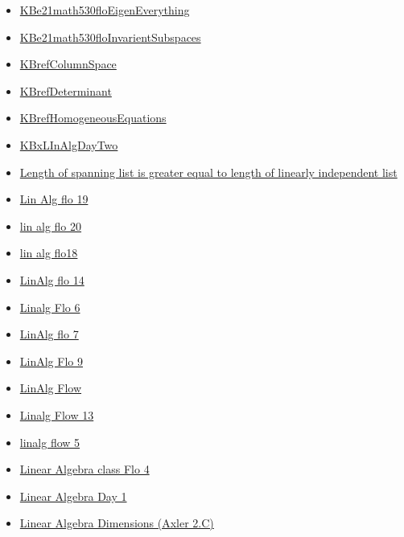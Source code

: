 \documentclass[11pt]{article}
\begin{document}
\begin{itemize}
\begin{itemize}
\begin{itemize}
\item \href{mathematics/linear\_algebra/KBe21math530floEigenEverything.org}{KBe21math530floEigenEverything}
\item \href{mathematics/linear\_algebra/KBe21math530floInvarientSubspaces.org}{KBe21math530floInvarientSubspaces}
\item \href{mathematics/linear\_algebra/KBrefColumnSpace.org}{KBrefColumnSpace}
\item \href{mathematics/linear\_algebra/KBrefDeterminant.org}{KBrefDeterminant}
\item \href{mathematics/linear\_algebra/KBrefHomogeneousEquations.org}{KBrefHomogeneousEquations}
\item \href{mathematics/linear\_algebra/KBxLInAlgDayTwo.org}{KBxLInAlgDayTwo}
\item \href{mathematics/linear\_algebra/KBe20math530retProofSpanningListLongerThanLinearIndependent.org}{Length of spanning list is greater equal to length of linearly independent list}
\item \href{mathematics/linear\_algebra/KBe20math530flo19.org}{Lin Alg flo 19}
\item \href{mathematics/linear\_algebra/KBe20math530flo20.org}{lin alg flo 20}
\item \href{mathematics/linear\_algebra/kbe20math530flo18.org}{lin alg flo18}
\item \href{mathematics/linear\_algebra/KBe20math530flo14.org}{LinAlg flo 14}
\item \href{mathematics/linear\_algebra/KBe20math530flo6.org}{Linalg Flo 6}
\item \href{mathematics/linear\_algebra/KBe20math530flo7.org}{LinAlg flo 7}
\item \href{mathematics/linear\_algebra/KBe20math530flo9.org}{LinAlg Flo 9}
\item \href{mathematics/linear\_algebra/KBe2020math530flo3.org}{LinAlg Flow}
\item \href{mathematics/linear\_algebra/KBe20math530flo13.org}{Linalg Flow 13}
\item \href{mathematics/linear\_algebra/KBe20math530flo5.org}{linalg flow 5}
\item \href{mathematics/linear\_algebra/KBe20math530flo4.org}{Linear Algebra class Flo 4}
\item \href{mathematics/linear\_algebra/KBe2020math530flo1.org}{Linear Algebra Day 1}
\item \href{mathematics/linear\_algebra/KBeRefLinAlgDimension.org}{Linear Algebra Dimensions (Axler 2.C)}

\end{itemize}
\end{itemize}
\end{itemize}
\end{document}
